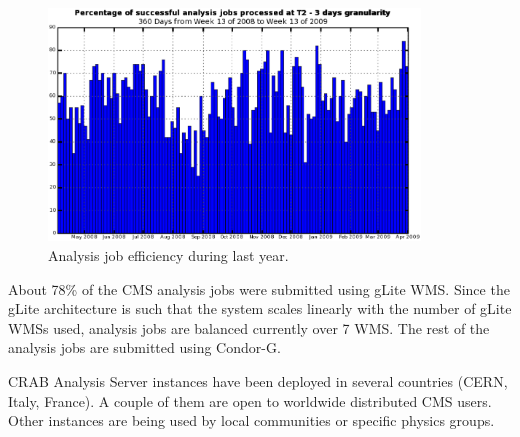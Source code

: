 \begin{figure}
\centering
\includegraphics[width=0.88\textwidth]{T2EffApril0809.eps}
\caption{Analysis job efficiency during last year. }
\label{fig:T2EffApril0809}
\end{figure}

About 78\% of the CMS analysis jobs were submitted using gLite WMS.  Since the gLite architecture is such that the system scales linearly with the number of gLite WMSs used, analysis jobs are balanced currently over 7 WMS. The rest of the analysis jobs are submitted using Condor-G.

CRAB Analysis Server instances have been deployed in several countries (CERN, Italy, France). A couple of them are open to worldwide distributed CMS users. Other instances are being used by local communities or specific physics groups.


